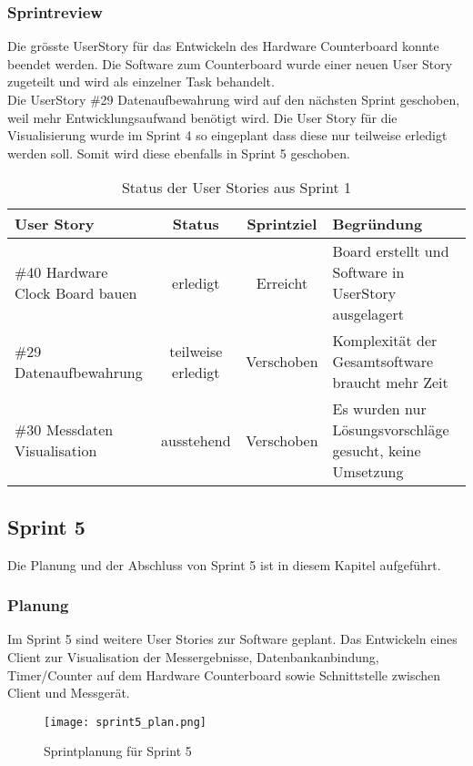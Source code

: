 \subsubsection*{Sprintreview}
Die grösste UserStory für das Entwickeln des Hardware Counterboard konnte beendet werden. Die Software zum Counterboard wurde einer neuen User Story zugeteilt und wird als einzelner Task behandelt.\\
Die UserStory \#29 Datenaufbewahrung wird auf den nächsten Sprint geschoben, weil mehr Entwicklungsaufwand benötigt wird. Die User Story für die Visualisierung wurde im Sprint 4 so eingeplant dass diese nur teilweise erledigt werden soll. Somit wird diese ebenfalls in Sprint 5 geschoben.
\begin{table}[H]
    \centering
    \begin{tabular}{p{4cm}ccp{7cm}}
        \textbf{User Story} &  \textbf{Status} & \textbf{Sprintziel}& \textbf{Begründung}\\\toprule[2pt]
        \#40 Hardware Clock Board bauen & erledigt & Erreicht & Board erstellt und Software in UserStory ausgelagert\\
        \#29 Datenaufbewahrung & teilweise erledigt & Verschoben & Komplexität der Gesamtsoftware braucht mehr Zeit\\
        \#30 Messdaten Visualisation & ausstehend & Verschoben & Es wurden nur Lösungsvorschläge gesucht, keine Umsetzung\\
    \end{tabular}
    \caption{Status der User Stories aus Sprint 1}
\end{table}

\clearpage
\subsection*{Sprint 5}
Die Planung und der Abschluss von Sprint 5 ist in diesem Kapitel aufgeführt.
\subsubsection*{Planung}
Im Sprint 5 sind weitere User Stories zur Software geplant. Das Entwickeln eines Client zur Visualisation der Messergebnisse, Datenbankanbindung, Timer/Counter auf dem Hardware Counterboard sowie Schnittstelle zwischen Client und Messgerät.
\begin{figure}[H]
    \centering
    \texttt{[image: sprint5\_plan.png]}
    \caption{Sprintplanung für Sprint 5}
\end{figure}
